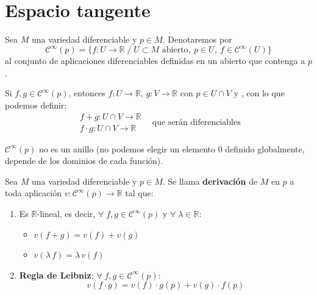 \justifying
\chapter{Espacio tangente}
Sea $M$ una variedad diferenciable y $p \in M$. Denotaremos por $$\mathcal{C}^{\infty}(p) = \{f:U\to \mathbb{R} \; / \; U \subset M \text{ abierto},\: p \in U, \: f\in \mathcal{C}^{\infty}(U)\}$$ al conjunto de aplicaciones diferenciables definidas en un abierto que contenga a $p$.

Si $f,g \in \mathcal{C}^{\infty}(p)$, entonces $f:U \to \mathbb{R}$, $g:V \to \mathbb{R}$ con $p \in U \cap V$ y , con lo que podemos definir:
$$\begin{array}{c}
    f+g: U \cap V \to \mathbb{R}\\
    f\cdot g: U \cap V \to \mathbb{R}
\end{array} \;\; \text{ que serán diferenciables}$$

\begin{obs}
$\mathcal{C}^{\infty}(p)$ no es un anillo (no podemos elegir un elemento 0 definido globalmente, depende de los dominios de cada funci\'on).
\end{obs}

\begin{defi}
Sea $M$ una variedad diferenciable y $p \in M$. Se llama \textbf{derivación} de $M$ en $p$ a toda aplicación $v:\mathcal{C}^{\infty}(p) \longrightarrow \mathbb{R}$ tal que:
\begin{enumerate}
    \item Es $\mathbb{R}$-lineal, es decir, $\forall \;f,g\in \mathcal{C}^{\infty}(p)$ y $\forall \;\lambda \in \mathbb{R}$:
    \begin{itemize}
        \item $v(f+g) = v(f) + v(g)$
        \item $v(\lambda\,f) = \lambda\,v(f)$
    \end{itemize}
    \item \textbf{Regla de Leibniz}: $\forall\; f,g \in \mathcal{C}^{\infty}(p)$: $$v(f\cdot g) = v(f) \cdot g(p) + v(g) \cdot f(p)$$
\end{enumerate}
\end{defi}

